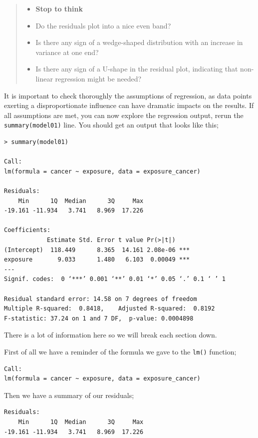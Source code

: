 \documentclass[
]{book}
\providecommand{\tightlist}{%
  \setlength{\itemsep}{0pt}\setlength{\parskip}{0pt}}
\begin{document}
\begin{quote}
\begin{itemize}
\tightlist
\item
  \textbf{Stop to think}
\item
  Do the residuals plot into a nice even band?
\item
  Is there any sign of a wedge-shaped distribution with an increase in variance at one end?
\item
  Is there any sign of a U-shape in the residual plot, indicating that non-linear regression might be needed?
\end{itemize}
\end{quote}

It is important to check thoroughly the assumptions of regression, as data points exerting a disproportionate influence can have dramatic impacts on the results. If all assumptions are met, you can now explore the regression output, rerun the \texttt{summary(model01)} line. You should get an output that looks like this;

\begin{verbatim}
> summary(model01)

Call:
lm(formula = cancer ~ exposure, data = exposure_cancer)

Residuals:
    Min      1Q  Median      3Q     Max 
-19.161 -11.934   3.741   8.969  17.226 

Coefficients:
            Estimate Std. Error t value Pr(>|t|)    
(Intercept)  118.449      8.365  14.161 2.08e-06 ***
exposure       9.033      1.480   6.103  0.00049 ***
---
Signif. codes:  0 ‘***’ 0.001 ‘**’ 0.01 ‘*’ 0.05 ‘.’ 0.1 ‘ ’ 1

Residual standard error: 14.58 on 7 degrees of freedom
Multiple R-squared:  0.8418,    Adjusted R-squared:  0.8192 
F-statistic: 37.24 on 1 and 7 DF,  p-value: 0.0004898
\end{verbatim}

There is a lot of information here so we will break each section down.

First of all we have a reminder of the formula we gave to the \texttt{lm()} function;

\begin{verbatim}
Call:
lm(formula = cancer ~ exposure, data = exposure_cancer)
\end{verbatim}

Then we have a summary of our residuals;

\begin{verbatim}
Residuals:
    Min      1Q  Median      3Q     Max 
-19.161 -11.934   3.741   8.969  17.226 
\end{verbatim}
\end{document}
